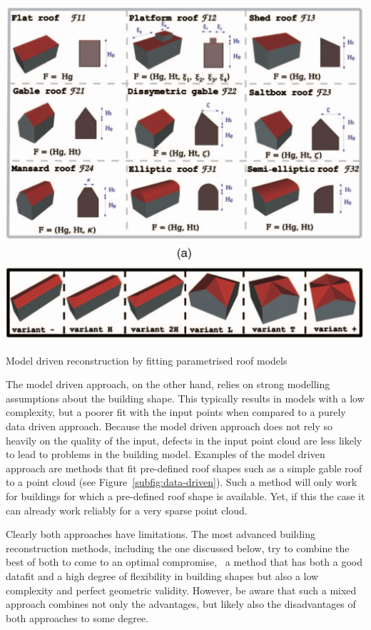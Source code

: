 \begin{marginfigure}
	\includegraphics[width=\linewidth]{figs/model-driven.png}
	\caption{Model driven reconstruction by fitting parametrised roof models \citep{Lafarge10}}%
	\label{subfig:model-driven}
\end{marginfigure}
The model driven approach, on the other hand, relies on strong modelling assumptions about the building shape.
This typically results in models with a low complexity, but a poorer fit with the input points when compared to a purely data driven approach.
Because the model driven approach does not rely so heavily on the quality of the input, defects in the input point cloud are less likely to lead to problems in the building model.
Examples of the model driven approach are methods that fit pre-defined roof shapes such as a simple gable roof to a point cloud (see Figure~\ref{subfig:data-driven}). 
Such a method will only work for buildings for which a pre-defined roof shape is available.
Yet, if this the case it can already work reliably for a very sparse point cloud.

Clearly both approaches have limitations. The most advanced building reconstruction methods, including the one discussed below, try to combine the best of both to come to an optimal compromise, \eg\ a method that has both a good datafit and a high degree of flexibility in building shapes but also a low complexity and perfect geometric validity. However, be aware that such a mixed approach combines not only the advantages, but likely also the disadvantages of both approaches to some degree.

